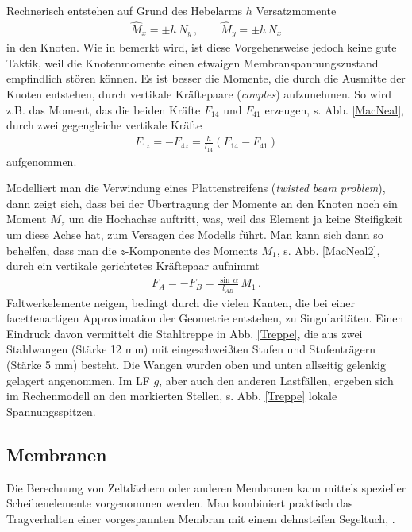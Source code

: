 Rechnerisch entstehen auf Grund des Hebelarms $h$ Versatzmomente
\begin{align}
\hat{M}_x = \pm h\,N_y\,, \qquad \hat{M}_y = \pm h\,N_x
\end{align}
in den Knoten. Wie in \cite{MacNeal} bemerkt wird, ist diese Vorgehensweise jedoch keine gute Taktik, weil die Knotenmomente einen etwaigen Membranspannungszustand empfindlich st\"{o}ren k\"{o}nnen. Es ist besser die Momente, die durch die Ausmitte der Knoten entstehen, durch vertikale Kr\"{a}ftepaare ({\em couples\/}) aufzunehmen. So wird z.B. das Moment, das die beiden Kr\"{a}fte $F_{14}$ und $F_{41}$ erzeugen, s. Abb. \ref{MacNeal}, durch zwei gegengleiche vertikale Kr\"{a}fte
\begin{align}
F_{1z} = - F_{4z} = \frac{h}{l_{14}} (F_{14} - F_{41})
\end{align}
aufgenommen.

Modelliert man die Verwindung eines Plattenstreifens ({\em twisted beam problem\/}), dann zeigt sich, dass bei der \"{U}bertragung der Momente an den Knoten noch ein Moment $M_z$ um die Hochachse auftritt, was, weil das Element ja keine Steifigkeit um diese Achse hat, zum Versagen des Modells f\"{u}hrt. Man kann sich dann so behelfen, dass man die $z$-Komponente des Moments $M_1$, s. Abb. \ref{MacNeal2}, durch ein vertikale gerichtetes Kr\"{a}ftepaar aufnimmt
\begin{align}
F_A = - F_B = \frac{\sin \,\alpha}{l_{AB}}\,M_1\,.
\end{align}
Faltwerkelemente neigen, bedingt durch die vielen Kanten, die bei einer facettenartigen Approximation der Geometrie entstehen, zu Singularit\"{a}ten. Einen Eindruck davon vermittelt die Stahltreppe in Abb. \ref{Treppe}, die aus zwei Stahlwangen (St\"{a}rke 12 mm) mit eingeschwei{\ss}ten Stufen und Stufentr\"{a}gern (St\"{a}rke 5 mm) besteht. Die Wangen wurden oben und unten allseitig gelenkig gelagert angenommen. Im LF $g$, aber auch den anderen Lastf\"{a}llen, ergeben sich im Rechenmodell an den markierten Stellen, s. Abb. \ref{Treppe} lokale Spannungsspitzen.

{\textcolor{sectionTitleBlue}{\section{Membranen}}}\label{Membranen}
Die Berechnung von Zeltd\"{a}chern oder anderen Membranen kann mittels spezieller Scheibenelemente vorgenommen werden. Man kombiniert praktisch das Tragverhalten einer vorgespannten Membran mit einem dehnsteifen Segeltuch, \cite{Bletzinger2}.

